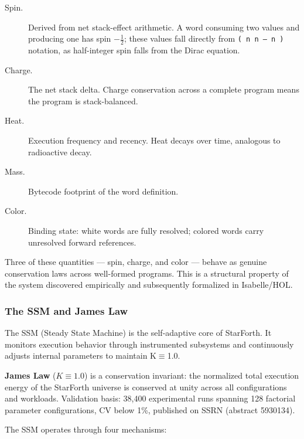 \begin{description}
  \item[Spin.] Derived from net stack-effect arithmetic. A word consuming
        two values and producing one has spin $-\tfrac{1}{2}$; these values
        fall directly from \texttt{(~n~n~--~n~)} notation, as half-integer
        spin falls from the Dirac equation.
  \item[Charge.] The net stack delta. Charge conservation across a complete
        program means the program is stack-balanced.
  \item[Heat.] Execution frequency and recency. Heat decays over time,
        analogous to radioactive decay.
  \item[Mass.] Bytecode footprint of the word definition.
  \item[Color.] Binding state: white words are fully resolved; colored words
        carry unresolved forward references.
\end{description}

Three of these quantities — spin, charge, and color — behave as genuine
conservation laws across well-formed programs. This is a structural property
of the system discovered empirically and subsequently formalized in
Isabelle/HOL.

\subsubsection{The SSM and James Law}

The SSM (Steady State Machine) is the self-adaptive core of StarForth.
It monitors execution behavior through instrumented subsystems and
continuously adjusts internal parameters to maintain K$\equiv$1.0.


\textbf{James Law} ($K \equiv 1.0$) is a conservation invariant: the
normalized total execution energy of the StarForth universe is conserved
at unity across all configurations and workloads. Validation basis:
38{,}400 experimental runs spanning 128 factorial parameter configurations,
CV below 1\%, published on SSRN (abstract 5930134).

The SSM operates through four mechanisms:

